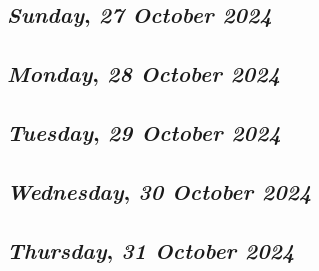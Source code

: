 \def\day{\textit{27 October 2024}}
\def\weekday{\textit{Sunday}}
\subsection*{\weekday, \day}

\def\day{\textit{28 October 2024}}
\def\weekday{\textit{Monday}}
\subsection*{\weekday, \day}

\def\day{\textit{29 October 2024}}
\def\weekday{\textit{Tuesday}}
\subsection*{\weekday, \day}

\def\day{\textit{30 October 2024}}
\def\weekday{\textit{Wednesday}}
\subsection*{\weekday, \day}

\def\day{\textit{31 October 2024}}
\def\weekday{\textit{Thursday}}
\subsection*{\weekday, \day}
